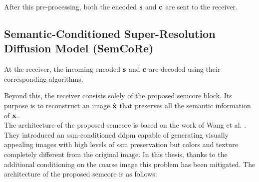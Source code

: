 After this pre-processing, both the encoded $\mathbf{s}$ and $\mathbf{c}$ are sent to the receiver.

\subsection{Semantic-Conditioned Super-Resolution Diffusion Model (SemCoRe)}\label{sec: SPIC semcore}

At the receiver, the incoming encoded $\mathbf{s}$ and $\mathbf{c}$ are decoded using their corresponding algorithms.

Beyond this, the receiver consists solely of the proposed \gls{semcore} block. Its purpose is to reconstruct an image $\hat{\mathbf{x}}$ that preserves all the semantic information of $\mathbf{x}$. \\

The architecture of the proposed \gls{semcore} is based on the work of Wang et al. \cite{Wang2022SISDM}. They introduced an \gls{ssm}-conditioned \gls{ddpm} capable of generating visually appealing images with high levels of \gls{ssm} preservation but colors and texture completely different from the original image. In this thesis, thanks to the additional conditioning on the coarse image this problem has been mitigated. The architecture of the proposed \gls{semcore} is as follows:

